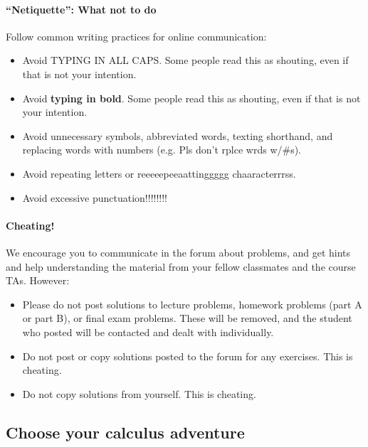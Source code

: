 \documentclass[pdftex, brazil, 12pt, twoside]{article}
\begin{document}
\paragraph{``Netiquette'': What not to do}
Follow common writing practices for online communication:

\begin{itemize}[noitemsep]
\item Avoid TYPING IN ALL CAPS. Some people read this as shouting, even if that is not your intention.
\item Avoid \textbf{typing in bold}. Some people read this as shouting, even if that is not your intention.
\item Avoid unnecessary symbols, abbreviated words, texting shorthand, and replacing words with numbers (e.g. Pls don't rplce wrds w/\#s).
\item Avoid repeating letters or reeeeepeeaattinggggg chaaracterrrss.
\item Avoid excessive punctuation!!!!!!!!
\end{itemize}

\paragraph{Cheating!}
We encourage you to communicate in the forum about problems, and get hints and help understanding the material from your fellow classmates and the course TAs. However:

\begin{itemize}[noitemsep]
\item Please do not post solutions to lecture problems, homework problems (part A or part B), or final exam problems. These will be removed, and the student who posted will be contacted and dealt with individually.
\item Do not post or copy solutions posted to the forum for any exercises. This is cheating.
\item Do not copy solutions from yourself. This is cheating.
\end{itemize}


\subsection{Choose your calculus adventure}
\label{gs-adventure}

\end{document}
